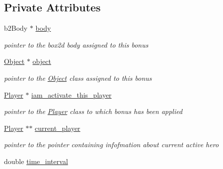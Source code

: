 \subsection*{Private Attributes}
\begin{DoxyCompactItemize}
\item 
\mbox{\label{class_bonus_a0c3f3fe18e7d7df28ab12fe2c023d3ff}} 
b2\+Body $\ast$ \hyperlink{class_bonus_a0c3f3fe18e7d7df28ab12fe2c023d3ff}{body}
\begin{DoxyCompactList}\small\item\em pointer to the box2d body assigned to this bonus \end{DoxyCompactList}\item 
\mbox{\label{class_bonus_a7493d5e3afda12e197c5505a66a1c7a1}} 
\hyperlink{class_object}{Object} $\ast$ \hyperlink{class_bonus_a7493d5e3afda12e197c5505a66a1c7a1}{object}
\begin{DoxyCompactList}\small\item\em pointer to the \hyperlink{class_object}{Object} class assigned to this bonus \end{DoxyCompactList}\item 
\mbox{\label{class_bonus_a5c03f6529a87fd393efaedb0db7e8b49}} 
\hyperlink{class_player}{Player} $\ast$ \hyperlink{class_bonus_a5c03f6529a87fd393efaedb0db7e8b49}{iam\+\_\+activate\+\_\+this\+\_\+player}
\begin{DoxyCompactList}\small\item\em pointer to the \hyperlink{class_player}{Player} class to which bonus has been applied \end{DoxyCompactList}\item 
\mbox{\label{class_bonus_ad5b0534727679d924f60eeaef2ac988d}} 
\hyperlink{class_player}{Player} $\ast$$\ast$ \hyperlink{class_bonus_ad5b0534727679d924f60eeaef2ac988d}{current\+\_\+player}
\begin{DoxyCompactList}\small\item\em pointer to the pointer containing infofmation about current active hero \end{DoxyCompactList}\item 
\mbox{\label{class_bonus_a4a5cd25b27a40406d018e1e3e651d21f}} 
double \hyperlink{class_bonus_a4a5cd25b27a40406d018e1e3e651d21f}{time\+\_\+interval}
$$
\end{DoxyCompactItemize}
